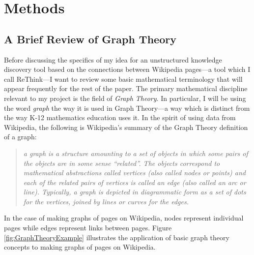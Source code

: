 \documentclass[man, 12pt, floatsintext, donotrepeattitle]{apa6}
\begin{document}

\section{Methods}

\subsection{A Brief Review of Graph Theory}
Before discussing the specifics of my idea for an unstructured knowledge
discovery tool based on the connections between Wikipedia pages---a tool which
I call ReThink---I want to review some basic mathematical
terminology that will appear frequently for the rest of the paper.  The primary
mathematical discipline relevant to my project is the field of
\emph{Graph Theory}.  In particular, I will be using the word \emph{graph}
the way it is used in Graph Theory---a way which is distinct from the way K-12
mathematics education uses it. In the spirit of using data from Wikipedia, the
following is Wikipedia's summary of the Graph Theory definition of a graph:
\begingroup
    \fontsize{10pt}{12pt}\selectfont
    \begin{quote}
      \emph{a graph is a structure amounting to a set of objects in which some
      pairs of the objects are in some sense ``related''. The objects correspond
      to mathematical abstractions called vertices (also called nodes or points)
      and each of the related pairs of vertices is called an edge (also called
      an arc or line). Typically, a graph is depicted in diagrammatic form
      as a set of dots for the vertices, joined by lines or curves for the
      edges.}
      \parencite{WikimediaFoundation2017}
    \end{quote}
\endgroup
In the case of making graphs of pages on Wikipedia, nodes represent
individual pages while edges represent links between pages.  Figure
\ref{fig:GraphTheoryExample} illustrates the application of basic graph theory
concepts to making graphs of pages on Wikipedia.
\end{document}
